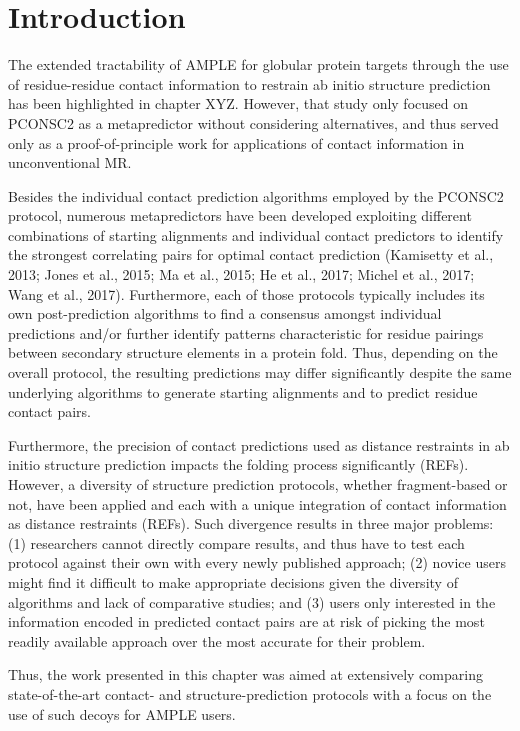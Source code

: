 ﻿\section{Introduction}
The extended tractability of AMPLE for globular protein targets through the use of residue-residue contact information to restrain ab initio structure prediction has been highlighted in chapter XYZ. However, that study only focused on PCONSC2 as a metapredictor without considering alternatives, and thus served only as a proof-of-principle work for applications of contact information in unconventional MR.

Besides the individual contact prediction algorithms employed by the PCONSC2 protocol, numerous metapredictors have been developed exploiting different combinations of starting alignments and individual contact predictors to identify the strongest correlating pairs for optimal contact prediction (Kamisetty et al., 2013; Jones et al., 2015; Ma et al., 2015; He et al., 2017; Michel et al., 2017; Wang et al., 2017). Furthermore, each of those protocols typically includes its own post-prediction algorithms to find a consensus amongst individual predictions and/or further identify patterns characteristic for residue pairings between secondary structure elements in a protein fold. Thus, depending on the overall protocol, the resulting predictions may differ significantly despite the same underlying algorithms to generate starting alignments and to predict residue contact pairs.

Furthermore, the precision of contact predictions used as distance restraints in ab initio structure prediction impacts the folding process significantly (REFs). However, a diversity of structure prediction protocols, whether fragment-based or not, have been applied and each with a unique integration of contact information as distance restraints (REFs). Such divergence results in three major problems: (1) researchers cannot directly compare results, and thus have to test each protocol against their own with every newly published approach; (2) novice users might find it difficult to make appropriate decisions given the diversity of algorithms and lack of comparative studies; and (3) users only interested in the information encoded in predicted contact pairs are at risk of picking the most readily available approach over the most accurate for their problem.

Thus, the work presented in this chapter was aimed at extensively comparing state-of-the-art contact- and structure-prediction protocols with a focus on the use of such decoys for AMPLE users.

